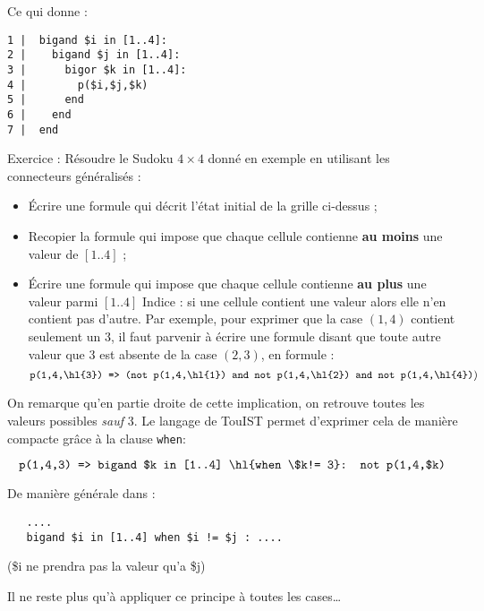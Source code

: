 Ce qui donne : 
\begin{verbatim}
1 |  bigand $i in [1..4]:
2 |    bigand $j in [1..4]:
3 |      bigor $k in [1..4]:
4 |        p($i,$j,$k)
5 |      end
6 |    end
7 |  end
\end{verbatim}

Exercice : Résoudre le Sudoku $4\times 4$ donné en exemple en utilisant les connecteurs généralisés :
\begin{itemize}
	\item Écrire une formule qui décrit l'état initial de la grille ci-dessus ;
    \item Recopier la formule qui impose que chaque cellule contienne \textbf{au moins} une valeur de $[1..4]$ ;
	\item Écrire une formule qui impose que chaque cellule contienne \textbf{au plus} une valeur parmi $[1..4]$ 
Indice : si une cellule contient une valeur alors elle n'en contient pas d'autre. Par exemple, pour exprimer que la case $(1,4)$ contient seulement un 3, il faut parvenir à écrire une formule disant que toute autre valeur que 3 est absente de la case $(2,3)$, en formule : 
\[\texttt{p(1,4,\hl{3}) => (not p(1,4,\hl{1}) and not p(1,4,\hl{2}) and not p(1,4,\hl{4})})\]
\end{itemize}
On remarque qu'en partie droite de cette implication, on retrouve toutes les valeurs possibles \emph{sauf} 3. Le langage de TouIST permet d'exprimer cela de manière compacte grâce à la clause \texttt{when}: 

\[\texttt{p(1,4,3) => bigand \$k in [1..4] \hl{when \$k!= 3}: not p(1,4,\$k)}\]

De manière générale dans : 
\begin{verbatim}
   ....
   bigand $i in [1..4] when $i != $j : ....
\end{verbatim}
(\$i ne prendra pas la valeur qu'a \$j)

Il ne reste plus qu'à appliquer ce principe à toutes les cases\ldots